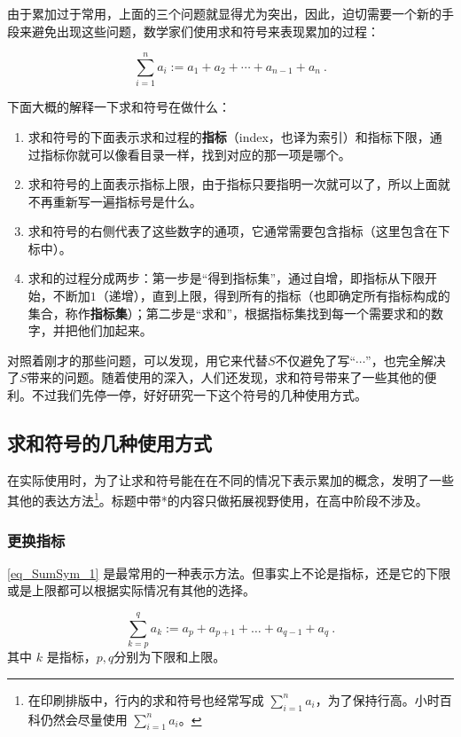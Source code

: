 由于累加过于常用，上面的三个问题就显得尤为突出，因此，迫切需要一个新的手段来避免出现这些问题，数学家们使用求和符号来表现累加的过程：

\begin{equation}\label{eq_SumSym_1}
\sum_{i=1}^n a_i:=a_1+a_2+\cdots+a_{n-1}+a_{n}~.
\end{equation}

下面大概的解释一下求和符号在做什么：
\begin{enumerate}
\item 求和符号的下面表示求和过程的\textbf{指标}（index，也译为索引）和指标下限，通过指标你就可以像看目录一样，找到对应的那一项是哪个。
\item 求和符号的上面表示指标上限，由于指标只要指明一次就可以了，所以上面就不再重新写一遍指标号是什么。
\item 求和符号的右侧代表了这些数字的通项，它通常需要包含指标（这里包含在下标中）。
\item 求和的过程分成两步：第一步是“得到指标集”，通过自增，即指标从下限开始，不断加$1$（递增），直到上限，得到所有的指标（也即确定所有指标构成的集合，称作\textbf{指标集}）；第二步是“求和”，根据指标集找到每一个需要求和的数字，并把他们加起来。
\end{enumerate}

对照着刚才的那些问题，可以发现，用它来代替$S$不仅避免了写“$\cdots$”，也完全解决了$S$带来的问题。随着使用的深入，人们还发现，求和符号带来了一些其他的便利。不过我们先停一停，好好研究一下这个符号的几种使用方式。

\subsection{求和符号的几种使用方式}

在实际使用时，为了让求和符号能在在不同的情况下表示累加的概念，发明了一些其他的表达方法\footnote{在印刷排版中，行内的求和符号也经常写成 $\sum_{i=1}^n a_i$，为了保持行高。小时百科仍然会尽量使用 $\sum\limits_{i=1}^n a_i$。}。标题中带*的内容只做拓展视野使用，在高中阶段不涉及。

\subsubsection{更换指标}

\autoref{eq_SumSym_1} 是最常用的一种表示方法。但事实上不论是指标，还是它的下限或是上限都可以根据实际情况有其他的选择。

\begin{equation}
\sum_{k=p}^q a_k := a_p + a_{p+1} + \dots +a_{q-1}+ a_q~.
\end{equation}
其中 $k$ 是指标，$p,q$分别为下限和上限。


